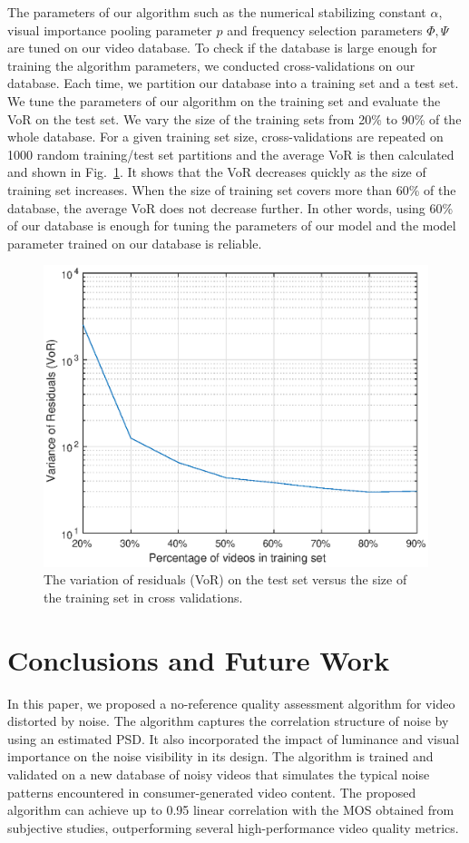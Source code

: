 \documentclass{sig-alternate}
\begin{document}
The parameters of our algorithm such as the numerical stabilizing constant $\alpha$, visual importance pooling parameter $p$ and frequency selection parameters $\Phi, \Psi$ are tuned on our video database. To check if the database is large enough for training the algorithm parameters, we conducted cross-validations on our database. Each time, we partition our database into a training set and a test set. We tune the parameters of our algorithm on the training set and evaluate the VoR on the test set. We vary the size of the training sets from 20\% to 90\% of the whole database. For a given training set size, cross-validations are repeated on 1000 random training/test set partitions and the average VoR is then calculated and shown in Fig.~\ref{fig:cross_validation}. It shows that the VoR decreases quickly as the size of training set increases. When the size of training set covers more than 60\% of the database, the average VoR does not decrease further. In other words, using 60\% of our database is enough for tuning the parameters of our model and the model parameter trained on our database is reliable. 
\begin{figure}
\includegraphics[width=\columnwidth]{./img/cross_validation.eps}
\caption{\label{fig:cross_validation} The variation of residuals (VoR) on the test set versus the size of the training set in cross validations.}
\end{figure}

\section{Conclusions and Future Work}
\label{sec:conclusion}
In this paper, we proposed a no-reference quality assessment algorithm for video distorted by noise. The algorithm captures the correlation structure of noise by using an estimated PSD. It also incorporated the impact of luminance and visual importance on the noise visibility in its design. The algorithm is trained and validated on a new database of noisy videos that simulates the typical noise patterns encountered in consumer-generated video content. The proposed algorithm can achieve up to 0.95 linear correlation with the MOS obtained from subjective studies, outperforming several high-performance video quality metrics.
\end{document}
